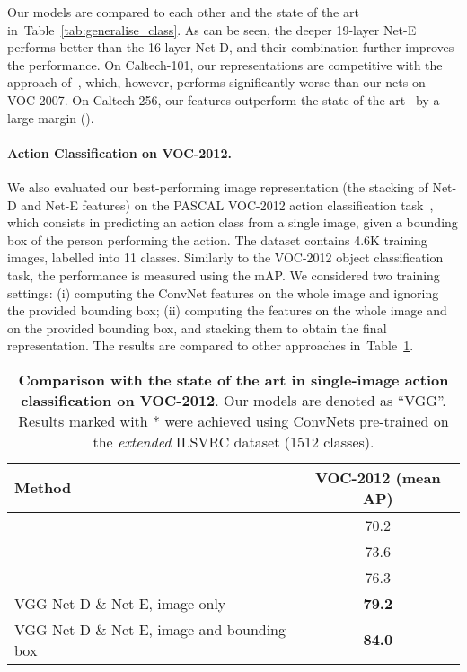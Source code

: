 \documentclass{article} \usepackage{iclr2015,times}
\newcommand{\tblref}[1]{Table~\ref{#1}}
\begin{document}
Our models are compared to each other and the state of the art in~\tblref{tab:generalise_class}. 
As can be seen, the deeper 19-layer Net-E performs better than the 16-layer Net-D, and their combination further improves the performance.
On Caltech-101, our representations are competitive with the approach of~\citet{He14}, which, however, performs significantly worse than our nets on VOC-2007. On Caltech-256, our features outperform the state of the art~\citep{Chatfield14} by a large margin (). 

\paragraph{Action Classification on VOC-2012.}
We also evaluated our best-performing image representation (the stacking of Net-D and Net-E features) on the PASCAL VOC-2012 action classification task~\citep{Everingham15}, which consists in predicting an action class from a single image, given a bounding box of the person performing the action. The dataset contains 4.6K training images, labelled into 11 classes. Similarly to the VOC-2012 object classification task, the performance is measured using the mAP. We considered two training settings: 
(i) computing the ConvNet features on the whole image and ignoring the provided bounding box;
(ii) computing the features on the whole image and on the provided bounding box, and stacking them to obtain the final representation.
The results are compared to other approaches in~\tblref{tab:generalise_action}.
\begin{table}[htb]
\setlength{\tabcolsep}{2pt}
\small
\centering
\caption{\textbf{Comparison with the state of the art in single-image action classification on VOC-2012}.
Our models are denoted as ``VGG''. 
Results marked with * were achieved using \mbox{ConvNets} pre-trained on the \emph{extended} ILSVRC dataset (1512 classes).
}
\begin{tabular}{|l|c|} \hline
Method & VOC-2012 (mean AP) \\ \hline
\citep{Oquab14} & 70.2 \\ \hline
\citep{Gkioxari14} & 73.6 \\ \hline
\citep{Hoai14a} & 76.3 \\ \hline\hline
VGG Net-D \& Net-E, image-only & \textbf{79.2} \\ \hline
VGG Net-D \& Net-E, image and bounding box & \textbf{84.0} \\ \hline
\end{tabular}
\label{tab:generalise_action}
\end{table}
\end{document}
